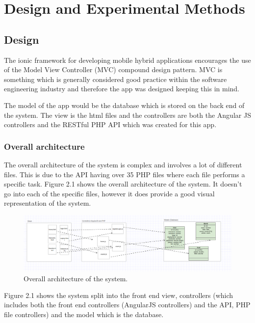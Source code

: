 \chapter{Design and Experimental Methods}
\section{Design}
The ionic framework for developing mobile hybrid applications encourages the use of the Model View Controller (MVC) compound design pattern. MVC is something which is generally considered good practice within the software engineering industry \cite{hybridcrap} and therefore the app was designed keeping this in mind.

The model of the app would be the database which is stored on the back end of the system. The view is the html files and the controllers are both the Angular JS controllers and the RESTful PHP API which was created for this app.

\subsection{Overall architecture}
The overall architecture of the system is complex and involves a lot of different files. This is due to the API having over 35 PHP files where each file performs a specific task. Figure 2.1 shows the overall architecture of the system. It doesn't go into each of the specific files, however it does provide a good visual representation of the system.

\begin{center} 
\begin{figure}[H]
\includegraphics[scale = 1.5,width=\textwidth,height=\textheight,keepaspectratio]{images/overall}
\caption{Overall architecture of the system.}
\end{figure}
\end{center}

Figure 2.1 shows the system split into the front end view, controllers (which includes both the front end controllers (AngularJS controllers) and the API, PHP file controllers) and the model which is the database.

